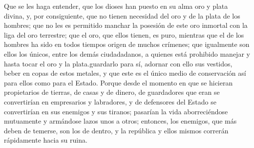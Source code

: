 \documentclass[10pt]{book}
\begin{document}
Que se les haga entender, que los dioses han puesto en su alma oro y plata divina, y, por consiguiente, que no tienen necesidad del oro y de la plata de los hombres; que no les es permitido manchar
la posesión de este oro inmortal con la liga del oro terrestre; que el oro, que ellos tienen, es puro, mientras que el de los hombres ha sido en todos tiempos origen de muchos crímenes; que igualmente son ellos los únicos, entre los demás ciudadadanos, a quienes está prohibido manejar y hasta tocar el oro y la plata.guardarlo para sí, adornar con ello sus vestidos, beber en copas de estos metales, y que este es el único medio de conservación así para ellos como para el Estado. Porque desde el momento en que se hicieran propietarios de tierras, de casas y de dinero, de guardadores que eran se convertirían en empresarios y labradores, y de defensores del Estado se convertirían en sus enemigos y sus tiranos; pasarían la vida aborreciéndose mutuamente y armándose lazos unos a otros; entonces, los enemigos, que más deben de temerse, son los de dentro, y la república y ellos mismos correrán rápidamente hacia su ruina.
\end{document}
